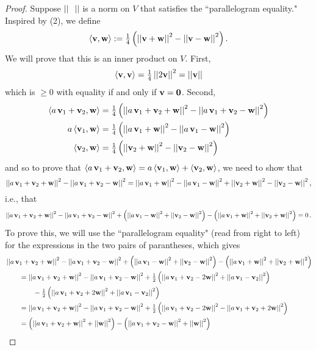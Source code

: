 \documentclass[11pt]{amsart}
\begin{document}
\begin{enumerate}[(1)]
\begin{proof}
Suppose $\norm{\ \ }$ is a norm on $V$ that satisfies the ``parallelogram equality."
Inspired by (2), we define
\[
  \left< \mathbf v, \mathbf w \right> := \tfrac 1 4 \left( \left|\left|  \mathbf v + \mathbf w  \right|\right|^2 - \left|\left|  \mathbf v - \mathbf w  \right|\right|^2 \right) .
\]
We will prove that this is an inner product on $V$.
First,
\[
  \left< \mathbf v, \mathbf v \right> = \tfrac 1 4 \left|\left|  2 \mathbf v  \right|\right|^2 = \left|\left| \mathbf v \right|\right|
\]
which is $\ge 0$ with equality if and only if $\mathbf v = \mathbf 0$.
Second,
\begin{align*}
  \left<  a \, \mathbf v_1 + \mathbf v_2 , \mathbf w \right> &= \tfrac 1 4 \left( \left|\left|  a \, \mathbf v_1 + \mathbf v_2 + \mathbf w  \right|\right|^2 - \left|\left|  a \, \mathbf v_1 + \mathbf v_2 - \mathbf w  \right|\right|^2 \right) \\
  a \left< \mathbf v_1, \mathbf w \right> &= \tfrac 1 4 \left( \left|\left|  a \, \mathbf v_1 + \mathbf w  \right|\right|^2 - \left|\left|  a \, \mathbf v_1 - \mathbf w  \right|\right|^2 \right) \\
  \left< \mathbf v_2, \mathbf w \right> &= \tfrac 1 4 \left( \left|\left|  \mathbf v_2 + \mathbf w  \right|\right|^2 - \left|\left|  \mathbf v_2 - \mathbf w  \right|\right|^2 \right) 
\end{align*}
and so to prove that $\left<  a \, \mathbf v_1 + \mathbf v_2 , \mathbf w \right> = a \left< \mathbf v_1, \mathbf w \right> + \left< \mathbf v_2, \mathbf w \right>$, we need to show that
\[
  \left|\left|  a \, \mathbf v_1 + \mathbf v_2 + \mathbf w  \right|\right|^2 - \left|\left|  a \, \mathbf v_1 + \mathbf v_2 - \mathbf w  \right|\right|^2
  = \left|\left|  a \, \mathbf v_1 + \mathbf w  \right|\right|^2 - \left|\left|  a \, \mathbf v_1 - \mathbf w  \right|\right|^2
  + \left|\left|  \mathbf v_2 + \mathbf w  \right|\right|^2 - \left|\left|  \mathbf v_2 - \mathbf w  \right|\right|^2 ,
\]
i.e., that
\[
  \left|\left|  a \, \mathbf v_1 + \mathbf v_2 + \mathbf w  \right|\right|^2 - \left|\left|  a \, \mathbf v_1 + \mathbf v_2 - \mathbf w  \right|\right|^2
  + \left( \left|\left|  a \, \mathbf v_1 - \mathbf w  \right|\right|^2 + \left|\left|  \mathbf v_2 - \mathbf w  \right|\right|^2 \right)
  - \left( \left|\left|  a \, \mathbf v_1 + \mathbf w  \right|\right|^2 + \left|\left|  \mathbf v_2 + \mathbf w  \right|\right|^2 \right)
  = 0 \, .
\]
To prove this, we will use the ``parallelogram equality" (read from right to left) for the expressions in the two pairs of parantheses, which gives
\begin{align*}
  &\norm{ a \, \v_1 + \v_2 + \w }^2 - \norm{ a \, \v_1 + \v_2 - \w }^2
  + \left( \norm{ a \, \v_1 - \w }^2 + \norm{ \v_2 - \w }^2 \right)
  - \left( \norm{ a \, \v_1 + \w }^2 + \norm{ \v_2 + \w }^2 \right) \\
  &\qquad = \norm{ a \, \v_1 + \v_2 + \w }^2 - \norm{ a \, \v_1 + \v_2 - \w }^2
  + \tfrac 1 2 \left( \norm{ a \, \v_1 + \v_2 - 2 \w }^2 + \norm{ a \, \v_1 - \v_2 }^2 \right) \\
  &\qquad \qquad - \tfrac 1 2 \left( \norm{ a \, \v_1 + \v_2 + 2 \w }^2 + \norm{ a \, \v_1 - \v_2 }^2 \right) \\
  &\qquad = \norm{ a \, \v_1 + \v_2 + \w }^2 - \norm{ a \, \v_1 + \v_2 - \w }^2
  + \tfrac 1 2 \left( \norm{ a \, \v_1 + \v_2 - 2 \w }^2 - \norm{ a \, \v_1 + \v_2 + 2 \w }^2 \right) \\
  &\qquad = \left( \norm{ a \, \v_1 + \v_2 + \w }^2 + \norm \w^2 \right) - \left( \norm{ a \, \v_1 + \v_2 - \w }^2 + \norm \w^2 \right) \\

\end{align*}
\end{proof}
\end{enumerate}
\end{document}
